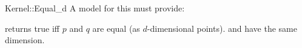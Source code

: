 \begin{ccRefFunctionObjectConcept}{Kernel::Equal_d}
A model for this must provide:


 {returns true iff $p$ and $q$ are equal (as
  $d$-dimensional points). \ccPrecond {} and  have the
  same dimension.}

\end{ccRefFunctionObjectConcept}
